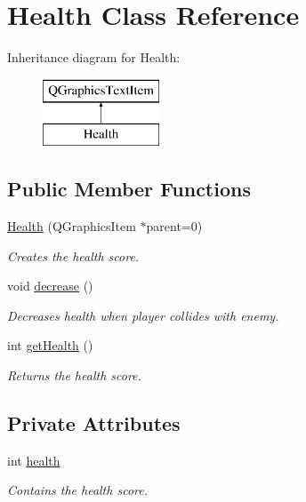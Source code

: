 \hypertarget{class_health}{}\section{Health Class Reference}
\label{class_health}
Inheritance diagram for Health\+:\begin{figure}[H]
\begin{center}
\leavevmode
\includegraphics[height=2.000000cm]{class_health}
\end{center}
\end{figure}
\subsection*{Public Member Functions}
\begin{DoxyCompactItemize}
\item 
\hyperlink{class_health_af8daf3e4533a91b1987d2297dd765208}{Health} (Q\+Graphics\+Item $\ast$parent=0)
\begin{DoxyCompactList}\small\item\em Creates the health score. \end{DoxyCompactList}\item 
void \hyperlink{class_health_a15836492efb60f8c61151d35379768d2}{decrease} ()
\begin{DoxyCompactList}\small\item\em Decreases health when player collides with enemy. \end{DoxyCompactList}\item 
int \hyperlink{class_health_adc5f045b9f6937c592e196821d7a6878}{get\+Health} ()
\begin{DoxyCompactList}\small\item\em Returns the health score. \end{DoxyCompactList}\end{DoxyCompactItemize}
\subsection*{Private Attributes}
\begin{DoxyCompactItemize}
\item 
int \hyperlink{class_health_a24ea36e28b6def54066e6164f97544b6}{health}\hypertarget{class_health_a24ea36e28b6def54066e6164f97544b6}{}\label{class_health_a24ea36e28b6def54066e6164f97544b6}

\begin{DoxyCompactList}\small\item\em Contains the health score. \end{DoxyCompactList}\end{DoxyCompactItemize}


